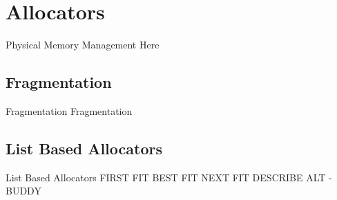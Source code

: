 \section[Allocators]{Allocators}
\begin{frame}{Physical Memory Management}
  Here
\end{frame}

\subsection[Fragmentation]{Fragmentation}
\begin{frame}{Fragmentation}
  Fragmentation
\end{frame}

\subsection[List Based Allocators]{List Based Allocators}
\begin{frame}{List Based Allocators}
  FIRST FIT 
  BEST FIT 
  NEXT FIT
  DESCRIBE ALT - BUDDY
\end{frame}
